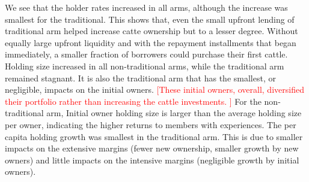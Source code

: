 	We see that the holder rates increased in all arms, although the increase was smallest for the \textsf{traditional}. This shows that, even the small upfront lending of \textsf{traditional} arm helped increase catte ownership but to a lesser degree. Without equally large upfront liquidity and with the repayment installments that began immediately, a smaller fraction of borrowers could purchase their first cattle. Holding size increased in all non-\textsf{traditional} arms, while the \textsf{traditional} arm remained stagnant. It is also the \textsf{traditional} arm that has the smallest, or negligible, impacts on the initial owners. \textcolor{red}{[These initial owners, overall, diversified their portfolio rather than increasing the cattle investments. ]} For the non-\textsf{traditional} arm, Initial owner holding size is larger than the average holding size per owner, indicating the higher returns to members with experiences. The per capita holding growth was smallest in the \textsf{traditional} arm. This is due to smaller impacts on the extensive margins (fewer new ownership, smaller growth by new owners) and little impacts on the intensive margins (negligible growth by initial owners). 


\begin{figure}
\end{figure}


